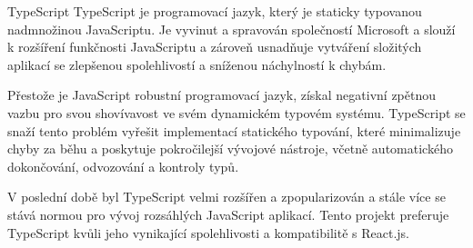 \begin{subsection}{TypeScript}
    \label{subsec:implementace-technologie-typescript}
    TypeScript je programovací jazyk, který je staticky typovanou nadmnožinou JavaScriptu.
    Je vyvinut a spravován společností Microsoft a slouží k rozšíření funkčnosti JavaScriptu a zároveň usnadňuje vytváření složitých aplikací se zlepšenou spolehlivostí a sníženou náchylností k chybám\cite{g_www_geeksforgeeks_org_difference_between_typescript_and_javascript}.

    Přestože je JavaScript robustní programovací jazyk, získal negativní zpětnou vazbu pro svou shovívavost ve svém dynamickém typovém systému.
    TypeScript se snaží tento problém vyřešit implementací statického typování, které minimalizuje chyby za běhu a poskytuje pokročilejší vývojové nástroje, včetně automatického dokončování, odvozování a kontroly typů\cite{g_www_geeksforgeeks_org_difference_between_typescript_and_javascript}.

    V poslední době byl TypeScript velmi rozšířen a zpopularizován a stále více se stává normou pro vývoj rozsáhlých JavaScript aplikací\cite{ct_the_relevance_of_typescript_in_2022_}.
    Tento projekt preferuje TypeScript kvůli jeho vynikající spolehlivosti a kompatibilitě s React.js.
\end{subsection}

